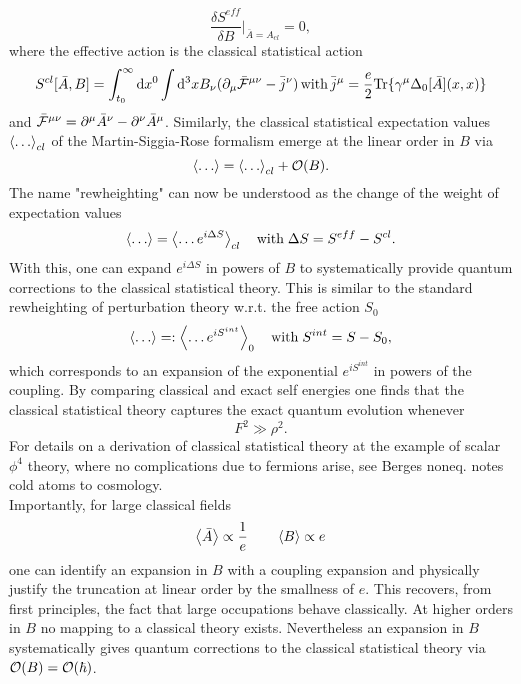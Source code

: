 \begin{equation}
	\frac{\delta S^{eff}}{\delta B}|_{\bar{A}=A_{cl}} = 0,
\end{equation}
where the effective action is the classical statistical action
\begin{equation}
	S^{cl}[\bar{A},B] = \int_{t_0}^{\infty} \mathrm{d} x^0 \int \mathrm{d}^3x B_\nu(\partial_\mu \bar{\mathcal{F}}^{\mu\nu} - \bar{j}^\nu) \,\mathrm{with\,} \bar{j}^\mu = \frac{e}{2} \mathrm{Tr}\{\gamma^\mu \Delta_0[\bar{A}] (x,x)\}
\end{equation}
and $\bar{\mathcal{F}}^{\mu\nu} = \partial^\mu \bar{A}^{\nu} - \partial^\nu \bar{A}^\mu$. Similarly, the classical statistical expectation values $\expval{\dots}_{cl}$ of the Martin-Siggia-Rose formalism emerge at the linear order in $B$ via
\begin{equation}
	\expval{\dots} = \expval{\dots}_{cl} + \mathcal{O}(B).
\end{equation}
The name "rewheighting" can now be understood as the change of the weight of expectation values
\begin{equation}
	\expval{\dots} = \expval{\dots e^{i\Delta S}}_{cl} \quad \mathrm{with}\; \Delta S=S^{eff}-S^{cl}.
\end{equation}
With this, one can expand $e^{i\Delta S}$ in powers of $B$ to systematically provide quantum corrections to the classical statistical theory. This is similar to the standard rewheighting of perturbation theory w.r.t. the free action $S_0$
\begin{equation}
	\expval{\dots} =: \expval{\dots e^{i S^{int}}}_0 \quad \mathrm{with}\; S^{int}=S-S_0,
\end{equation}
which corresponds to an expansion of the exponential $e^{i S^{int}}$ in powers of the coupling. By comparing classical and exact self energies one finds that the classical statistical theory captures the exact quantum evolution whenever 
\begin{equation}
	F^2 \gg \rho^2.
\end{equation}
For details on a derivation of classical statistical theory at the example of scalar $\phi^4$ theory, where no complications due to fermions arise, see Berges noneq. notes cold atoms to cosmology.\\
Importantly, for large classical fields
\begin{equation}
	\expval{\bar{A}} \propto \frac{1}{e}\qquad \expval{B}\propto e
\end{equation}
one can identify an expansion in $B$ with a coupling expansion and physically justify the truncation at linear order by the smallness of $e$. This recovers, from first principles, the fact that large occupations behave classically. At higher orders in $B$ no mapping to a classical theory exists. Nevertheless an expansion in $B$ systematically gives quantum corrections to the classical statistical theory via $\mathcal{O}(B) = \mathcal{O}(\hbar)$.









